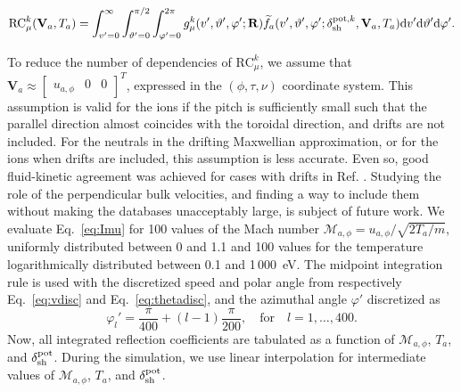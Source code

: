 \begin{equation}
\mathrm{RC}_{\mu}^{k}(\mathbf{V}_a,T_a) = \int_{v'=0}^{\infty} \int_{\vartheta'=0}^{\pi/2} \int_{\varphi'=0}^{2\pi} g_{\mu}^{k}(v',\vartheta',\varphi';{\bf R}) \widetilde{f}_{a}(v',\vartheta',\varphi';\delta_{\mathrm{sh}}^{\mathrm{pot},k},\mathbf{V}_a,T_a) \mathrm{d} v' \mathrm{d} \vartheta' \mathrm{d} \varphi'. \label{eq:Imu}
\end{equation}

To reduce the number of dependencies of $\mathrm{RC}_{\mu}^{k}$, we assume that $\mathbf{V}_a \approx \begin{bmatrix} u_{a,\phi} & 0 & 0 \end{bmatrix}^{T}$, expressed in the $(\phi,\tau,\nu)$ coordinate system. This assumption is valid for the ions if the pitch is sufficiently small such that the parallel direction almost coincides with the toroidal direction, and drifts are not included. For the neutrals in the drifting Maxwellian approximation, or for the ions when drifts are included, this assumption is less accurate. Even so, good fluid-kinetic agreement was achieved for cases with drifts in Ref. \cite{psi_wim}. Studying the role of the perpendicular bulk velocities, and finding a way to include them without making the databases unacceptably large, is subject of future work.  We evaluate Eq.~\eqref{eq:Imu} for 100 values of the Mach number $\mathcal{M}_{a,\phi} = u_{a,\phi}/\sqrt{2 T_a /m}$, uniformly distributed between 0 and 1.1 and 100 values for the temperature logarithmically distributed between 0.1 and 1\,000~eV. The midpoint integration rule is used with the discretized speed and polar angle from respectively Eq.~\eqref{eq:vdisc} and Eq.~\eqref{eq:thetadisc}, and the azimuthal angle $\varphi'$ discretized as
\begin{equation}
\varphi_{l}' = \frac{\pi}{400} + (l-1) \frac{\pi}{200}, \quad \text{for} \quad l = 1,\ldots, 400.
\end{equation}
Now, all integrated reflection coefficients are tabulated as a function of $\mathcal{M}_{a,\phi}$, $T_{a}$, and $\delta_{\mathrm{sh}}^{\mathrm{pot}}$.  During the simulation, we use linear interpolation for intermediate values of $\mathcal{M}_{a,\phi}$, $T_a$, and $\delta_{\mathrm{sh}}^{\mathrm{pot}}$.






